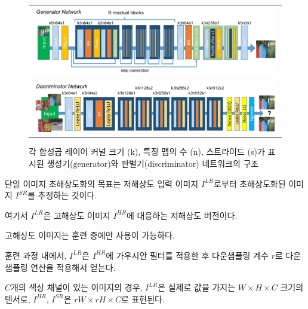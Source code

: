 \documentclass[10pt,twocolumn,letterpaper]{article}
\newcommand{\kor}[1]{#1}
\newcommand{\eng}[1]{}
\begin{document}
\begin{figure}[ht!]
\begin{center}
\begin{tabular}{c}
\includegraphics[width=6.5in]{images/used/jpg/generator}\\
\includegraphics[width=6.5in]{images/used/jpg/discriminator}
\end{tabular}
\end{center}
\caption{\eng{
Architecture of Generator and Discriminator Network with corresponding kernel size (k), number of feature maps (n) and stride (s) indicated for each convolutional layer.
}\kor{
각 합성곱 레이어 커널 크기 (k), 특징 맵의 수 (n), 스트라이드 (s)가 표시된 생성기(generator)와 판별기(discriminator) 네트워크의 구조
}}
\label{fig:generator}
\end{figure}
%
\eng{
In \ac{SISR} the aim is to estimate a high-resolution, super-resolved image $I^{SR}$ from a low-resolution input image $I^{LR}$.
}\kor{
\ac{단일 이미지 초해상도화}의 목표는 저해상도 입력 이미지 $I^{LR}$로부터 \ac{초해상도화}된 이미지 $I^{SR}$를 추정하는 것이다.
} \eng{
Here $I^{LR}$ is the low-resolution version of its high-resolution counterpart $I^{HR}$.
}\kor{
여기서 $I^{LR}$은 고해상도 이미지 $I^{HR}$에 대응하는 저해상도 버전이다.
} \eng{
The high-resolution images are only available during training.
}\kor{
고해상도 이미지는 훈련 중에만 사용이 가능하다.
} \eng{
In training, $I^{LR}$ is obtained by applying a Gaussian filter to $I^{HR}$ followed by a downsampling operation with downsampling factor $r$.
}\kor{
훈련 과정 내에서, $I^{LR}$은 $I^{HR}$에 가우시안 필터를 적용한 후 다운샘플링 계수 $r$로 다운샘플링 연산을 적용해서 얻는다.
} \eng{
For an image with $C$ color channels, we describe $I^{LR}$ by a real-valued tensor of size $W \times H \times C$ and $I^{HR}$, $I^{SR}$ by $rW \times rH \times C$ respectively.
}\kor{
$C$개의 색상 채널이 있는 이미지의 경우, $I^{LR}$은 실제로 값을 가지는 $W \times H \times C$ 크기의 텐서로, $I^{HR}$, $I^{SR}$은 $rW \times rH \times C$로 표현된다.
}
\end{document}
